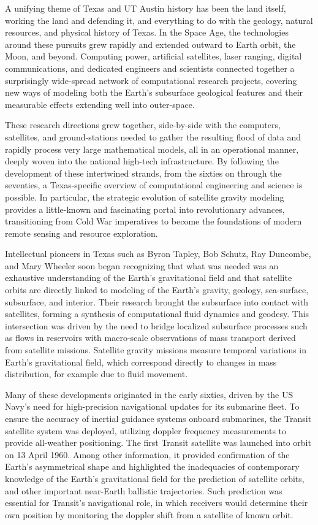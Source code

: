 A unifying theme of Texas and UT Austin history has been the land itself, working the land and defending it, and everything to do with the geology, natural resources, and physical history of Texas. In the Space Age, the technologies around these pursuits grew rapidly and extended outward to Earth orbit, the Moon, and beyond. Computing power, artificial satellites, laser ranging, digital communications, and dedicated engineers and scientists connected together a surprisingly wide-spread network of computational research projects, covering new ways of modeling both the Earth’s subsurface geological features and their measurable effects extending well into outer-space.

These research directions grew together, side-by-side with the computers, satellites, and ground-stations needed to gather the resulting flood of data and rapidly process very large mathematical models, all in an operational manner, deeply woven into the national high-tech infrastructure. By following the development of these intertwined strands, from the sixties on through the seventies, a Texas-specific overview of computational engineering and science is possible. In particular, the strategic evolution of satellite gravity modeling provides a little-known and fascinating portal into revolutionary advances, transitioning from Cold War imperatives to become the foundations of modern remote sensing and resource exploration. 

Intellectual pioneers in Texas such as Byron Tapley, Bob Schutz, Ray Duncombe, and Mary Wheeler soon began recognizing that what was needed was an exhaustive understanding of the Earth’s gravitational field and that satellite orbits are directly linked to modeling of the Earth’s gravity, geology, sea-surface, subsurface, and interior. Their research brought the subsurface into contact with satellites, forming a synthesis of computational fluid dynamics and geodesy. This intersection was driven by the need to bridge localized subsurface processes such as flows in reservoirs with macro-scale observations of mass transport derived from satellite missions. Satellite gravity missions measure temporal variations in Earth’s gravitational field, which correspond directly to changes in mass distribution, for example due to fluid movement. 

Many of these developments originated in the early sixties, driven by the US Navy’s need for high-precision navigational updates for its submarine fleet. To ensure the accuracy of inertial guidance systems onboard submarines, the Transit satellite system was deployed, utilizing doppler frequency measurements to provide all-weather positioning. The first Transit satellite was launched into orbit on 13 April 1960. Among other information, it provided confirmation of the Earth's asymmetrical shape and highlighted the inadequacies of contemporary knowledge of the Earth's gravitational field for the prediction of satellite orbits, and other important near-Earth ballistic trajectories. Such prediction was essential for Transit's navigational role, in which receivers would determine their own position by monitoring the doppler shift from a satellite of known orbit. 

